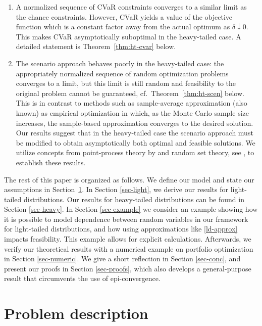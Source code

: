 \documentclass[a4paper, a4wide, 10pt, reqno]{amsart}
\theoremstyle{plain}
\begin{document}
\begin{enumerate}[leftmargin=17pt]
\item A normalized sequence of CVaR constraints converges to a similar limit as the chance constraints. However, CVaR yields a value of the objective function which is a constant factor away from the actual optimum as $\delta\downarrow0$. 
This makes CVaR asymptotically suboptimal in the heavy-tailed case.
A detailed statement is Theorem~\ref{thm:ht-cvar} below. 
    \item The scenario approach behaves poorly in the heavy-tailed case: the appropriately normalized sequence of random optimization problems converges to a limit, but this limit is still random and feasibility to the original problem cannot be guaranteed, cf.\ Theorem~\ref{thm:ht-scen} below. This is in contrast to methods such as sample-average approximation (also known) as empirical optimization in which, as the Monte Carlo sample size increases, the sample-based approximation converges to the desired solution. Our results suggest that in the heavy-tailed case the scenario approach must be modified to obtain asymptotically both optimal and feasible solutions. We utilize concepts from point-process theory by \cite{Resnick07} and random set theory, see \cite{Molchanov}, to establish these results. 
\end{enumerate}

The rest of this paper is organized as follows. 
We define our model and state our assumptions in Section~\ref{sec-problem}. In Section \ref{sec-light}, we derive our results for light-tailed distributions. 
Our results for heavy-tailed distributions can be found in Section \ref{sec-heavy}. In Section \ref{sec-example} we consider an example showing how it is possible to model dependence between random variables in our framework for light-tailed distributions, and how using approximations like \eqref{ld-approx} impacts feasibility. This example allows for explicit calculations. Afterwards, we verify our theoretical results with a numerical example on portfolio optimization in Section \ref{sec-numeric}. 
We give a short reflection in Section \ref{sec-conc}, and present our proofs in Section \ref{sec-proofs}, which also develops a general-purpose result that circumvents the use of epi-convergence. 




\section{Problem description}
\label{sec-problem}
\end{document}
